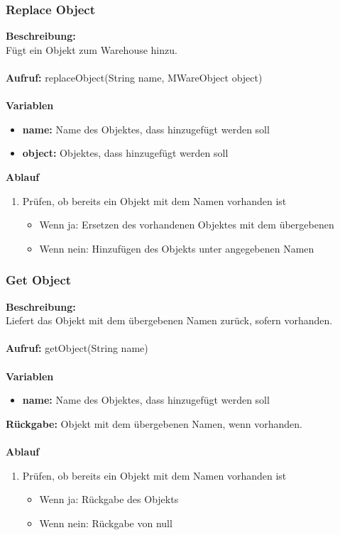 \subsubsection{Replace Object}
\textbf{Beschreibung:}\\
Fügt ein Objekt zum Warehouse hinzu. \\ \\
\textbf{Aufruf:} replaceObject(String name, MWareObject object)\\ \\
\textbf{Variablen}
\begin{itemize}
\item \textbf{name:} Name des Objektes, dass hinzugefügt werden soll
\item \textbf{object:} Objektes, dass hinzugefügt werden soll
\end{itemize}
\textbf{Ablauf}
\begin{enumerate}
\item Prüfen, ob bereits ein Objekt mit dem Namen vorhanden ist
\begin{itemize}
\item Wenn ja: Ersetzen des vorhandenen Objektes mit dem übergebenen
\item Wenn nein: Hinzufügen des Objekts unter angegebenen Namen
\end{itemize}
\end{enumerate}

\subsubsection{Get Object}
\textbf{Beschreibung:}\\
Liefert das Objekt mit dem übergebenen Namen zurück, sofern vorhanden. \\ \\
\textbf{Aufruf:} getObject(String name)\\ \\
\textbf{Variablen}
\begin{itemize}
\item \textbf{name:} Name des Objektes, dass hinzugefügt werden soll
\end{itemize}
\textbf{Rückgabe:} Objekt mit dem übergebenen Namen, wenn vorhanden.\\ \\
\textbf{Ablauf}
\begin{enumerate}
\item Prüfen, ob bereits ein Objekt mit dem Namen vorhanden ist
\begin{itemize}
\item Wenn ja: Rückgabe des Objekts
\item Wenn nein: Rückgabe von null
\end{itemize}
\end{enumerate}

